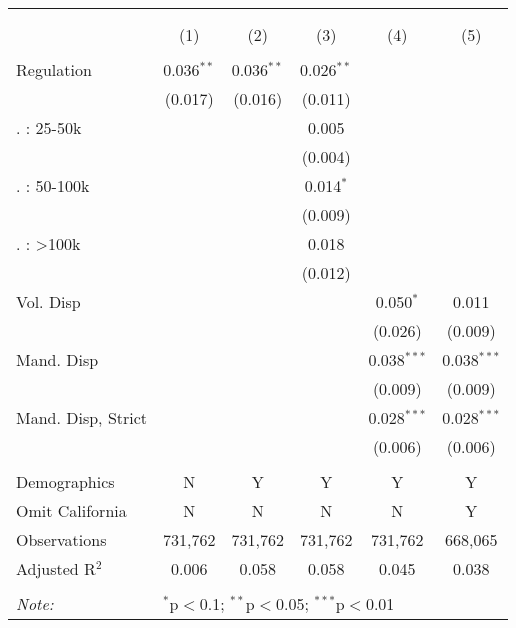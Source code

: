 
\begin{table}[!htbp] \centering 
  \caption{} 
  \label{} 
\begin{tabular}{@{\extracolsep{5pt}}lccccc} 
\\[-1.8ex]\hline 
\hline \\[-1.8ex] 
\\[-1.8ex] & (1) & (2) & (3) & (4) & (5)\\ 
\hline \\[-1.8ex] 
 Regulation & 0.036$^{**}$ & 0.036$^{**}$ & 0.026$^{**}$ &  &  \\ 
  & (0.017) & (0.016) & (0.011) &  &  \\ 
   . : 25-50k &  &  & 0.005 &  &  \\ 
  &  &  & (0.004) &  &  \\ 
   . : 50-100k &  &  & 0.014$^{*}$ &  &  \\ 
  &  &  & (0.009) &  &  \\ 
   . : >100k &  &  & 0.018 &  &  \\ 
  &  &  & (0.012) &  &  \\ 
  Vol. Disp &  &  &  & 0.050$^{*}$ & 0.011 \\ 
  &  &  &  & (0.026) & (0.009) \\ 
  Mand. Disp &  &  &  & 0.038$^{***}$ & 0.038$^{***}$ \\ 
  &  &  &  & (0.009) & (0.009) \\ 
  Mand. Disp, Strict &  &  &  & 0.028$^{***}$ & 0.028$^{***}$ \\ 
  &  &  &  & (0.006) & (0.006) \\ 
 \hline \\[-1.8ex] 
Demographics & N & Y & Y & Y & Y \\ 
Omit California & N & N & N & N & Y \\ 
Observations & 731,762 & 731,762 & 731,762 & 731,762 & 668,065 \\ 
Adjusted R$^{2}$ & 0.006 & 0.058 & 0.058 & 0.045 & 0.038 \\ 
\hline 
\hline \\[-1.8ex] 
\textit{Note:}  & \multicolumn{5}{l}{$^{*}$p$<$0.1; $^{**}$p$<$0.05; $^{***}$p$<$0.01} \\ 
\end{tabular} 
\end{table} 
